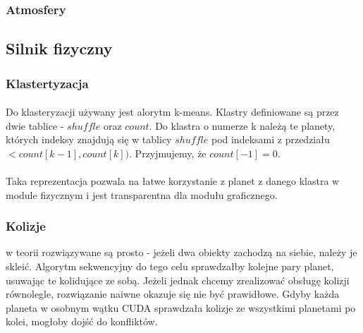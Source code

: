 \subsubsection{Atmosfery}\label{ssub:atmosfery}
\paragraph{}

\subsection{Silnik fizyczny}

\subsubsection{Klastertyzacja}

\paragraph{} Do klasteryzacji używany jest alorytm k-means. Klastry definiowane są przez dwie tablice - \ensuremath{shuffle} oraz \ensuremath{count}. Do klastra o numerze k należą te planety, których indeksy znajdują się w tablicy \ensuremath{shuffle} pod indeksami z przedziału \ensuremath{< count[k-1], count[k] )}. Przyjmujemy, że \ensuremath{count[-1] = 0}.

\paragraph{} Taka reprezentacja pozwala na łatwe korzystanie z planet z danego klastra w module fizycznym i jest transparentna dla modułu graficznego.

\subsubsection{Kolizje} w teorii rozwiązywane są prosto - jeżeli dwa obiekty zachodzą na siebie, należy je skleić. Algorytm sekwencyjny do tego celu sprawdzałby kolejne pary planet, usuwając te kolidujące ze sobą. Jeżeli jednak chcemy zrealizować obsługę kolizji równolegle, rozwiązanie naiwne okazuje się nie być prawidłowe. Gdyby każda planeta w osobnym wątku CUDA sprawdzała kolizje ze wszystkimi planetami po kolei, mogłoby dojść do konfliktów.

